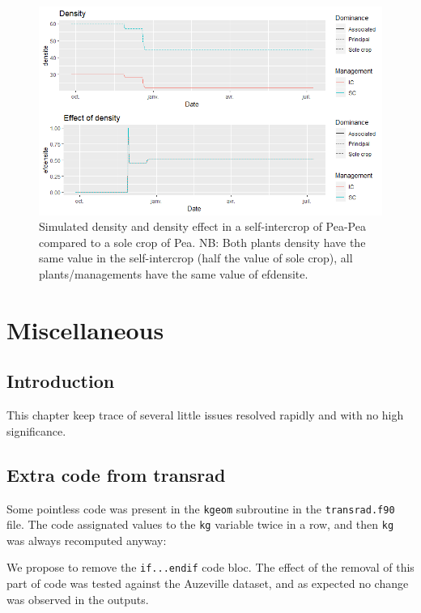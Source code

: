 \documentclass[
]{book}
\begin{document}
\begin{figure}
\centering
\includegraphics{img/efdensite.png}
\caption{\label{fig:efdensite}Simulated density and density effect in a self-intercrop of Pea-Pea compared to a sole crop of Pea. NB: Both plants density have the same value in the self-intercrop (half the value of sole crop), all plants/managements have the same value of efdensite.}
\end{figure}

\hypertarget{misc}{%
\chapter{Miscellaneous}\label{misc}}

\hypertarget{introduction-10}{%
\section{Introduction}\label{introduction-10}}

This chapter keep trace of several little issues resolved rapidly and with no high significance.

\hypertarget{extra-code-from-transrad}{%
\section{Extra code from transrad}\label{extra-code-from-transrad}}

Some pointless code was present in the \texttt{kgeom} subroutine in the \texttt{transrad.f90} file. The code assignated values to the \texttt{kg} variable twice in a row, and then \texttt{kg} was always recomputed anyway:

We propose to remove the \texttt{if...endif} code bloc. The effect of the removal of this part of code was tested against the Auzeville dataset, and as expected no change was observed in the outputs.
\end{document}
